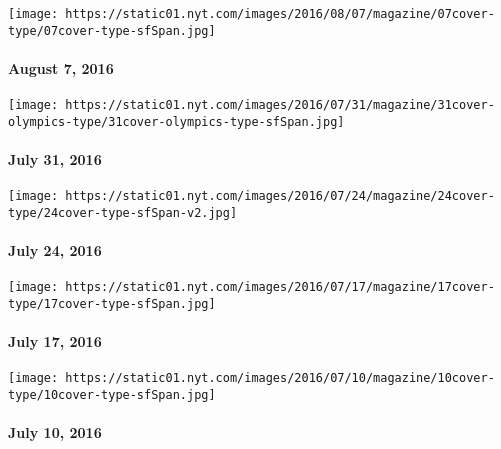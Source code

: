 \href{http://www.nytimes.com/indexes/2016/08/07/magazine/index.html}{}

\texttt{[image: https://static01.nyt.com/images/2016/08/07/magazine/07cover-type/07cover-type-sfSpan.jpg]}

\hypertarget{august-7-2016}{%
\paragraph{August 7, 2016}\label{august-7-2016}}

\href{http://www.nytimes.com/indexes/2016/07/31/magazine/index.html}{}

\texttt{[image: https://static01.nyt.com/images/2016/07/31/magazine/31cover-olympics-type/31cover-olympics-type-sfSpan.jpg]}

\hypertarget{july-31-2016}{%
\paragraph{July 31, 2016}\label{july-31-2016}}

\href{http://www.nytimes.com/indexes/2016/07/24/magazine/index.html}{}

\texttt{[image: https://static01.nyt.com/images/2016/07/24/magazine/24cover-type/24cover-type-sfSpan-v2.jpg]}

\hypertarget{july-24-2016}{%
\paragraph{July 24, 2016}\label{july-24-2016}}

\href{http://www.nytimes.com/indexes/2016/07/17/magazine/index.html}{}

\texttt{[image: https://static01.nyt.com/images/2016/07/17/magazine/17cover-type/17cover-type-sfSpan.jpg]}

\hypertarget{july-17-2016}{%
\paragraph{July 17, 2016}\label{july-17-2016}}

\href{http://www.nytimes.com/indexes/2016/07/10/magazine/index.html}{}

\texttt{[image: https://static01.nyt.com/images/2016/07/10/magazine/10cover-type/10cover-type-sfSpan.jpg]}

\hypertarget{july-10-2016}{%
\paragraph{July 10, 2016}\label{july-10-2016}}

